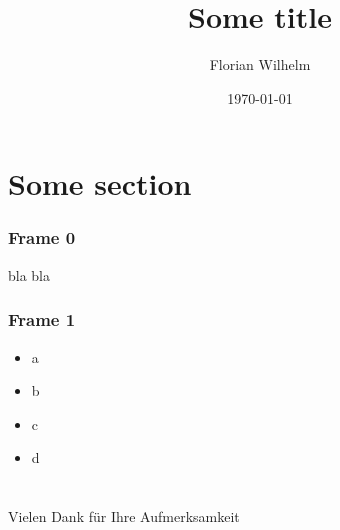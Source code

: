 \documentclass{beamer}
\title[]{Some title}
\author{Florian Wilhelm}
\date{\today{}}
\begin{document}
\frame{
	\titlepage
}


\section{Some section}

\setcounter{subsection}{1}
\begin{frame} 
  \frametitle{Frame 0}
  bla bla
\end{frame}

\setcounter{subsection}{1}
\begin{frame}
  \frametitle{Frame 1}
   \begin{itemize}
    \item{a}
    \item{b}
    \item{c}
    \item{d}
   \end{itemize}
\end{frame}

\section{}
\begin{frame}
  Vielen Dank für Ihre Aufmerksamkeit
\end{frame}
\end{document}

